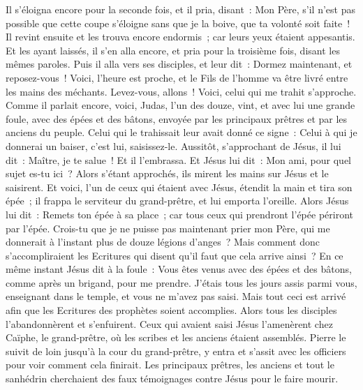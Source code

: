 \begin{multicols}{2}
Il s'éloigna encore pour la seconde fois, et il pria, disant~: Mon Père, s'il n'est pas possible que cette coupe s'éloigne sans que je la boive, que ta volonté soit faite~!
Il revint ensuite et les trouva encore endormis~; car leurs yeux étaient appesantis.
Et les ayant laissés, il s'en alla encore, et pria pour la troisième fois, disant les mêmes paroles.
Puis il alla vers ses disciples, et leur dit~: Dormez maintenant, et reposez-vous~! Voici, l'heure est proche, et le Fils de l'homme va être livré entre les mains des méchants.
Levez-vous, allons~! Voici, celui qui me trahit s'approche.
Comme il parlait encore, voici, Judas, l'un des douze, vint, et avec lui une grande foule, avec des épées et des bâtons, envoyée par les principaux prêtres et par les anciens du peuple.
Celui qui le trahissait leur avait donné ce signe~: Celui à qui je donnerai un baiser, c'est lui, saisissez-le.
Aussitôt, s'approchant de Jésus, il lui dit~: Maître, je te salue~! Et il l'embrassa.
Et Jésus lui dit~: Mon ami, pour quel sujet es-tu ici~? Alors s'étant approchés, ils mirent les mains sur Jésus et le saisirent.
Et voici, l'un de ceux qui étaient avec Jésus, étendit la main et tira son épée~; il frappa le serviteur du grand-prêtre, et lui emporta l'oreille.
Alors Jésus lui dit~: Remets ton épée à sa place~; car tous ceux qui prendront l'épée périront par l'épée.
Crois-tu que je ne puisse pas maintenant prier mon Père, qui me donnerait à l'instant plus de douze légions d'anges~?
Mais comment donc s'accompliraient les Ecritures qui disent qu'il faut que cela arrive ainsi~?
En ce même instant Jésus dit à la foule~: Vous êtes venus avec des épées et des bâtons, comme après un brigand, pour me prendre. J'étais tous les jours assis parmi vous, enseignant dans le temple, et vous ne m'avez pas saisi.
Mais tout ceci est arrivé afin que les Ecritures des prophètes soient accomplies. Alors tous les disciples l'abandonnèrent et s'enfuirent.
Ceux qui avaient saisi Jésus l'amenèrent chez Caïphe, le grand-prêtre, où les scribes et les anciens étaient assemblés.
Pierre le suivit de loin jusqu'à la cour du grand-prêtre, y entra et s'assit avec les officiers pour voir comment cela finirait.
Les principaux prêtres, les anciens et tout le sanhédrin cherchaient des faux témoignages contre Jésus pour le faire mourir.

\end{multicols}
